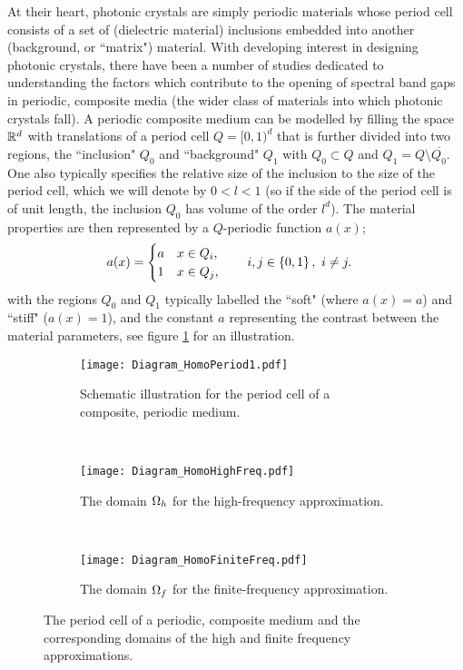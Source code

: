 At their heart, photonic crystals are simply periodic materials whose period cell consists of a set of (dielectric material) inclusions embedded into another (background, or ``matrix") material.
With developing interest in designing photonic crystals, there have been a number of studies dedicated to understanding the factors which contribute to the opening of spectral band gaps in periodic, composite media (the wider class of materials into which photonic crystals fall).
A periodic composite medium can be modelled by filling the space $\mathbb{R}^d$ with translations of a period cell $Q=[0,1)^d$ that is further divided into two regions, the ``inclusion" $Q_0$ and ``background" $Q_1$ with $Q_0\subset Q$ and $Q_1=Q\setminus\overline{Q_0}$.
One also typically specifies the relative size of the inclusion to the size of the period cell, which we will denote by $0<l<1$ (so if the side of the period cell is of unit length, the inclusion $Q_0$ has volume of the order $l^d$).
The material properties are then represented by a $Q$-periodic function $a(x)$;
\begin{align*}
	a(x) &= \begin{cases} a & x\in Q_i, \\ 1 & x\in Q_j, \end{cases}
	\qquad i,j\in\left\{ 0,1 \right\}, \ i\neq j.
\end{align*}
with the regions $Q_0$ and $Q_1$ typically labelled the ``soft" (where $a(x)=a$) and ``stiff" ($a(x)=1$), and the constant $a$ representing the contrast between the material parameters, see figure \ref{fig:Diagram_HomoPeriod1} for an illustration.
\begin{figure}[t]
	\centering
	\begin{subfigure}[t]{0.3\textwidth}
		\centering
		\texttt{[image: Diagram\_HomoPeriod1.pdf]}
		\caption{\label{fig:Diagram_HomoPeriod1} Schematic illustration for the period cell of a composite, periodic medium.}
	\end{subfigure}
	~
	\begin{subfigure}[t]{0.3\textwidth}
		\centering
		\texttt{[image: Diagram\_HomoHighFreq.pdf]}
		\caption{\label{fig:Diagram_HomoHighFreq} The domain $\Omega_h$ for the high-frequency approximation.}
	\end{subfigure}
	~
	\begin{subfigure}[t]{0.3\textwidth}
		\centering
		\texttt{[image: Diagram\_HomoFiniteFreq.pdf]}
		\caption{\label{fig:Diagram_HomoFiniteFreq} The domain $\Omega_f$ for the finite-frequency approximation.}
	\end{subfigure}
	\caption{\label{fig:Diagram_HomoFreqRanges} The period cell of a periodic, composite medium and the corresponding domains of the high and finite frequency approximations.}	
\end{figure}
